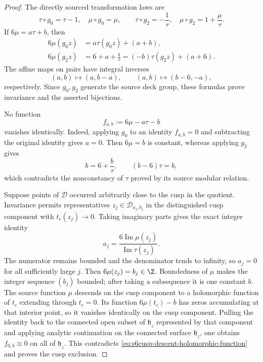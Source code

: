 \begin{proof}
The directly sourced transformation laws are
\begin{equation}\label{eq:s6cusp-descent-source-laws}
 \tau\circ g_0=\tau-1,
 \quad \mu\circ g_0=\mu,
 \qquad
 \tau\circ g_2=-\frac1\tau,
 \quad \mu\circ g_2=1+\frac\mu\tau.
\end{equation}
If \(6\mu=a\tau+b\), then
\begin{align*}
 6\mu(g_0z)
 &=a\tau(g_0z)+(a+b),\\
 6\mu(g_2z)
 &=6+a+\frac b\tau
 =(-b)\tau(g_2z)+(a+6).
\end{align*}
The affine maps on pairs have integral inverses
\begin{equation}\label{eq:s6cusp-descent-pair-inverses}
 (a,b)\longmapsto(a,b-a),
 \qquad
 (a,b)\longmapsto(b-6,-a),
\end{equation}
respectively.  Since \(g_0,g_2\) generate the source deck group, these
formulas prove invariance and the asserted bijections.

No function
\begin{equation}\label{eq:s6cusp-descent-holomorphic-function}
 f_{a,b}:=6\mu-a\tau-b
\end{equation}
vanishes identically.  Indeed, applying \(g_0\) to an identity
\(f_{a,b}=0\) and subtracting the original identity gives \(a=0\).
Then \(6\mu=b\) is constant, whereas applying \(g_2\) gives
\begin{equation}\label{eq:s6cusp-descent-constant-contradiction}
 b=6+\frac b\tau,
 \qquad
 (b-6)\tau=b,
\end{equation}
which contradicts the nonconstancy of \(\tau\) proved by its source modular
relation.

Suppose points of \(\mathscr D\) occurred arbitrarily close to the cusp in
the quotient.  Invariance permits representatives
\(z_j\in\mathscr D_{a_j,b_j}\) in the distinguished cusp component with
\(t_c(z_j)\to0\).  Taking imaginary parts gives the exact integer identity
\begin{equation}\label{eq:s6cusp-descent-integer-a}
 a_j=\frac{6\operatorname{Im}\mu(z_j)}
 {\operatorname{Im}\tau(z_j)}.
\end{equation}
The numerator remains bounded and the denominator tends to infinity, so
\(a_j=0\) for all sufficiently large \(j\).  Then
\(6\mu(z_j)=b_j\in\Z\).  Boundedness of \(\mu\) makes the integer sequence
\((b_j)\) bounded; after taking a subsequence it is one constant \(b\).
The source function \(\mu\) descends on the cusp component to a holomorphic
function of \(t_c\) extending through \(t_c=0\).  Its function
 \(6\mu(t_c)-b\) has zeros accumulating at that interior point, so it
 vanishes identically on the cusp component.  Pulling the identity back to
 the connected open subset of \(\mathfrak h_z\) represented by that component
 and applying analytic continuation on the connected surface
 \(\mathfrak h_z\), one obtains \(f_{0,b}\equiv0\) on all of
 \(\mathfrak h_z\).  This contradicts
 \eqref{eq:s6cusp-descent-holomorphic-function} and proves the cusp exclusion.


\end{proof}
